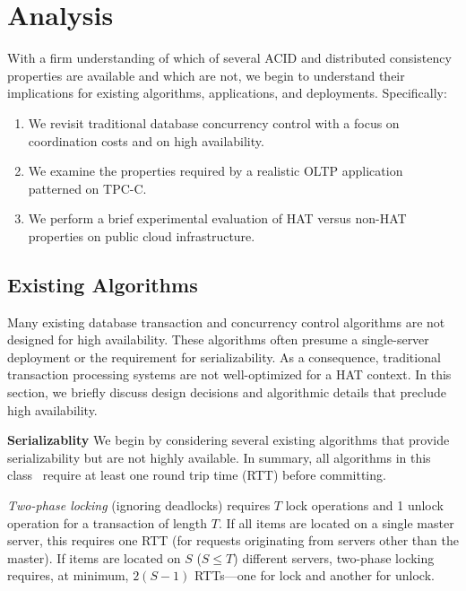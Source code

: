 
\section{Analysis}
\label{sec:evaluation}

With a firm understanding of which of several ACID and distributed
consistency properties are available and which are not, we begin to
understand their implications for existing algorithms, applications,
and deployments. Specifically:

\begin{enumerate}
\item We revisit traditional database concurrency control with a focus
  on coordination costs and on high availability.
\item We examine the properties required by a realistic OLTP
  application patterned on TPC-C.
\item We perform a brief experimental evaluation of HAT versus non-HAT
  properties on public cloud infrastructure.
\end{enumerate}

\subsection{Existing Algorithms}

Many existing database transaction and concurrency control algorithms
are not designed for high availability. These algorithms often presume
a single-server deployment or the requirement for serializability. As
a consequence, traditional transaction processing systems are not
well-optimized for a HAT context. In this section, we briefly discuss
design decisions and algorithmic details that preclude high
availability.

\vspace{.5em}\noindent\textbf{Serializablity} We begin by considering several
existing algorithms that provide serializability but are not highly
available. In summary, all algorithms in this
class~\cite{bernstein-book} require at least one round trip time (RTT)
before committing.

\vspace{.5em}\noindent\textit{Two-phase locking} (ignoring deadlocks) requires $T$ lock
operations and 1 unlock operation for a transaction of length $T$. If
all items are located on a single master server, this requires one RTT
(for requests originating from servers other than the master). If
items are located on $S$ ($S \leq T$) different servers, two-phase
locking requires, at minimum, $2(S-1)$ RTTs---one for lock and another
for unlock.

